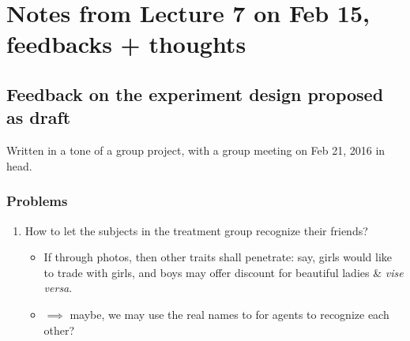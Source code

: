 \documentclass{article}
\begin{document}
\section{Notes from Lecture 7 on Feb 15, feedbacks + thoughts }

\subsection{Feedback on the experiment design proposed as draft}
Written in a tone of a group project, with a group meeting on Feb 21, 2016 in
head.

\subsubsection{Problems}

\begin{enumerate}
    \item How to let the subjects in the treatment group recognize their
        friends?
        \begin{itemize}
            \item If through photos, then other traits shall penetrate: say,
                girls would like to trade with girls, and boys may offer
                discount for beautiful ladies \& \textit{vise versa}.
            \item $\implies$ maybe, we may use the real names to
                for agents to recognize each other?


\end{itemize}
\end{enumerate}
\end{document}
